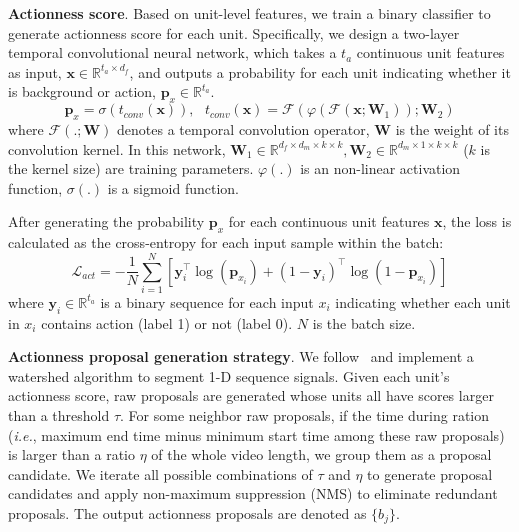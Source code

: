 \documentclass[runningheads]{llncs}
\begin{document}
\textbf{Actionness score}. Based on unit-level features, we train a binary classifier to generate actionness score for each unit. Specifically, we design a two-layer temporal convolutional neural network, which takes a $t_a$ continuous unit features as input, $\mathbf{x}\in\mathbb{R}^{t_a\times d_f}$, and outputs a probability for each unit indicating whether it is background or action, $\bm{p}_x\in\mathbb{R}^{t_a}$. 
\begin{equation}\label{equ: actioness score}
\bm{p}_x = \sigma(t_{conv}(\mathbf{x})),\text{\ \ \ } t_{conv}(\mathbf{x}) = \mathcal{F}(\varphi(\mathcal{F}(\mathbf{x}; \mathbf{W}_1));\mathbf{W}_2)
\end{equation}
where $\mathcal{F}(.;\mathbf{W})$ denotes a temporal convolution operator, $\mathbf{W}$ is the weight of its convolution kernel. 
In this network, $\mathbf{W}_1\in\mathbb{R}^{d_f\times d_m\times k \times k}, \mathbf{W}_2\in\mathbb{R}^{d_m\times1\times k \times k}$ ($k$ is the kernel size) are training parameters.
$\varphi(.)$ is an non-linear activation function, $\sigma(.)$ is a sigmoid function.

After generating the probability $\bm{p}_x$ for each continuous unit features $\mathbf{x}$, the loss is calculated as the cross-entropy for each input sample within the batch: 
\begin{equation}\label{equ: obj act score}
\mathcal{L}_{act} = -\frac{1}{N}\sum_{i=1}^N\left[\mathbf{y}_i^\top\log(\bm{p}_{x_i})+(1-\mathbf{y}_i)^\top\log(1-\bm{p}_{x_i})\right]
\end{equation}
where $\mathbf{y}_i\in\mathbb{R}^{t_a}$ is a binary sequence for each input $x_i$ indicating whether each unit in $x_i$ contains action (label 1) or not (label 0). $N$ is the batch size.


\textbf{Actionness proposal generation strategy}. We follow~\cite{Zhao_2017_ICCV} and implement a watershed algorithm \cite{roerdink2000watershed} to segment 1-D sequence signals. 
Given each unit's actionness score, raw proposals are generated whose units all have scores larger than a threshold $\tau$.
For some neighbor raw proposals, if the time during ration (\emph{i.e.}, maximum end time minus minimum start time among these raw proposals) is larger than a ratio $\eta$ of the whole video length, we group them as a proposal candidate. 
We iterate all possible combinations of $\tau$ and $\eta$ to generate proposal candidates and apply non-maximum suppression (NMS) to eliminate redundant proposals. 
The output actionness proposals are denoted as $\{b_j\}$.
\end{document}
